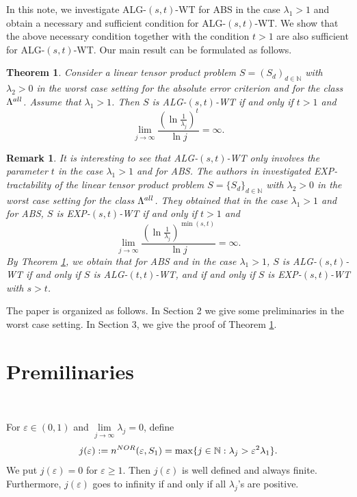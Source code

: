 \documentclass[10pt,a4paper]{amsart}
\newtheorem{thm}{Theorem}[section]
\newtheorem{rem}{Remark}
\numberwithin{equation}{section}
\def\vz{\varepsilon}
\def\lz{\lambda}
\newcommand{\NN}{\mathbb{N}}
\def\NN{{\mathbb N}}
\begin{document}
In  this note, we investigate ALG-$(s,t)$-WT for ABS in the case
$\lz_1>1$ and obtain a necessary and sufficient condition for
 ALG-$(s,t)$-WT. We show that  the above necessary condition
 together with
 the condition $t>1$ are also sufficient for ALG-$(s,t)$-WT. Our
 main result can be formulated as follows.








\begin{thm}\label{thm1} Consider a linear tensor product problem $S=(S_d)_{d\in\NN}$ with $\lambda_2>0$ in the
worst case setting for the absolute error criterion and for the
class $\Lambda^{\rm all}$.
 Assume that $\lambda_1>1$. Then $S$ is ALG-$(s,t)$-WT if and only if
 $t>1$ and
\begin{equation}\label{1.3}
\lim_{j\rightarrow\infty}\frac{(\ln\frac{1}{\lambda_j})^t}{\ln
j}=\infty.
\end{equation}
\end{thm}


\begin{rem}It is interesting
to see that ALG-$(s,t)$-WT only involves the parameter $t$ in the
case $\lz_1>1$ and for ABS. The authors in \cite{PPW17}
investigated EXP-tractability of the linear tensor product problem
 $S=\{S_d\}_{d\in\NN}$ with $\lambda_2>0$ in the
worst case setting  for the class $\Lambda^{\rm all}$. They
obtained that in the case $\lz_1> 1$ and for ABS, $S$ is
EXP-$(s,t)$-WT if and only if $t>1$ and
\begin{equation*}
\lim_{j\rightarrow\infty}\frac{(\ln\frac{1}{\lambda_j})^{\min(s,t)}}{\ln
j}=\infty.
\end{equation*}By Theorem \ref{thm1}, we obtain that  for ABS and in the case $\lz_1> 1$, $S$ is
ALG-$(s,t)$-WT if and only if  $S$ is ALG-$(t,t)$-WT, and  if and
only if  $S$ is EXP-$(s,t)$-WT with $s>t$.
\end{rem}

The paper is organized as follows. In Section 2 we give some
preliminaries in the worst case setting. In Section 3, we give the
proof of Theorem \ref{thm1}.


\section{Premilinaries}\






For $\varepsilon \in (0,1)$ and
$\lim\limits_{j\to\infty}\lambda_j=0$, define
\begin{equation}
 j(\varepsilon) :=n^{\rm NOR}(\vz,S_1)=  \max\{j \in \NN : \lambda_j > \varepsilon^2\lambda_1\}.
\end{equation}
We put $j(\vz)=0$
for $\vz\ge1$. Then $j(\vz)$ is well defined and always finite.   Furthermore, $j(\vz)$ goes
to infinity if and only if all $\lambda_j$'s are positive.
\end{document}

